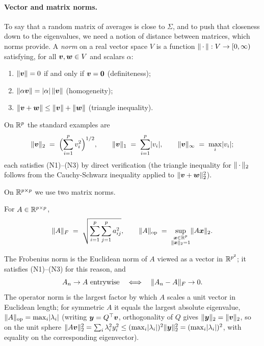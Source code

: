 \paragraph{Vector and matrix norms.}
To say that a random matrix of averages is close to \(\Sigma\), and to push that closeness down to the eigenvalues, we need a notion of distance between matrices, which norms provide. A \emph{norm} on a real vector space \(V\) is a function \(\lVert\,\cdot\,\rVert: V \to [0, \infty)\) satisfying, for all \(\bm{v}, \bm{w} \in V\) and scalars \(\alpha\):
\begin{enumerate}[label=\textnormal{(N\arabic*)},leftmargin=*]
  \item \(\lVert\bm{v}\rVert = 0\) if and only if \(\bm{v} = \bm{0}\) (definiteness);
  \item \(\lVert\alpha \bm{v}\rVert = \lvert\alpha\rvert\, \lVert\bm{v}\rVert\) (homogeneity);
  \item \(\lVert\bm{v} + \bm{w}\rVert \le \lVert\bm{v}\rVert + \lVert\bm{w}\rVert\) (triangle inequality).
\end{enumerate}
On \(\mathbb{R}^p\) the standard examples are
\[
  \lVert\bm{v}\rVert_2 \;=\; \Bigl(\sum_{i=1}^p v_i^2\Bigr)^{1/2}, \qquad \lVert\bm{v}\rVert_1 \;=\; \sum_{i=1}^p \lvert v_i\rvert, \qquad \lVert\bm{v}\rVert_\infty \;=\; \max_i \lvert v_i\rvert;
\]
each satisfies (N1)--(N3) by direct verification (the triangle inequality for \(\lVert\,\cdot\,\rVert_2\) follows from the Cauchy-Schwarz inequality applied to \(\lVert\bm{v} + \bm{w}\rVert_2^2\)).

On \(\mathbb{R}^{p \times p}\) we use two matrix norms.

\begin{definition}\label{def:frob-op}
For \(A \in \mathbb{R}^{p \times p}\),
\[
  \lVert A\rVert_F \;=\; \sqrt{\sum_{i=1}^p \sum_{j=1}^p a_{ij}^2}, \qquad \lVert A\rVert_{\mathrm{op}} \;=\; \sup_{\substack{\bm{x} \in \mathbb{R}^p \\ \lVert\bm{x}\rVert_2 = 1}} \lVert A \bm{x}\rVert_2.
\]
\end{definition}

The Frobenius norm is the Euclidean norm of \(A\) viewed as a vector in \(\mathbb{R}^{p^2}\); it satisfies (N1)--(N3) for this reason, and
\[
  A_n \to A \text{ entrywise} \quad \Longleftrightarrow \quad \lVert A_n - A\rVert_F \to 0.
\]
The operator norm is the largest factor by which \(A\) scales a unit vector in Euclidean length; for symmetric \(A\) it equals the largest absolute eigenvalue, \(\lVert A\rVert_{\mathrm{op}} = \max_i \lvert\lambda_i\rvert\) (writing \(\bm{y} = Q^{\top}\bm{v}\), orthogonality of \(Q\) gives \(\lVert\bm{y}\rVert_2 = \lVert\bm{v}\rVert_2\), so on the unit sphere \(\lVert A \bm{v}\rVert_2^2 = \sum_i \lambda_i^2 y_i^2 \le (\max_i \lvert\lambda_i\rvert)^2 \lVert\bm{y}\rVert_2^2 = (\max_i \lvert\lambda_i\rvert)^2\), with equality on the corresponding eigenvector).

